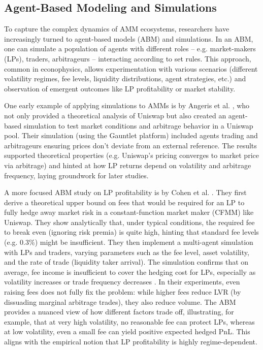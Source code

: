 \documentclass[11pt]{article}
\begin{document}
\subsection{Agent-Based Modeling and Simulations}
To capture the complex dynamics of AMM ecosystems, researchers have increasingly turned to agent-based models (ABM) and simulations. In an ABM, one can simulate a population of agents with different roles – e.g. market-makers (LPs), traders, arbitrageurs – interacting according to set rules. This approach, common in econophysics, allows experimentation with various scenarios (different volatility regimes, fee levels, liquidity distributions, agent strategies, etc.) and observation of emergent outcomes like LP profitability or market stability.

One early example of applying simulations to AMMs is by Angeris et al. \cite{angeris2020}, who not only provided a theoretical analysis of Uniswap but also created an agent-based simulation to test market conditions and arbitrage behavior in a Uniswap pool. Their simulation (using the Gauntlet platform) included agents trading and arbitrageurs ensuring prices don’t deviate from an external reference. The results supported theoretical properties (e.g. Uniswap’s pricing converges to market price via arbitrage) and hinted at how LP returns depend on volatility and arbitrage frequency, laying groundwork for later studies.

A more focused ABM study on LP profitability is by Cohen et al. \cite{cohen2023}. They first derive a theoretical upper bound on fees that would be required for an LP to fully hedge away market risk in a constant-function market maker (CFMM) like Uniswap. They show analytically that, under typical conditions, the required fee to break even (ignoring risk premia) is quite high, hinting that standard fee levels (e.g. 0.3\%) might be insufficient. They then implement a multi-agent simulation with LPs and traders, varying parameters such as the fee level, asset volatility, and the rate of trade (liquidity taker arrival). The simulation confirms that on average, fee income is insufficient to cover the hedging cost for LPs, especially as volatility increases or trade frequency decreases \cite{cohen2023}. In their experiments, even raising fees does not fully fix the problem: while higher fees reduce LVR (by dissuading marginal arbitrage trades), they also reduce volume. The ABM provides a nuanced view of how different factors trade off, illustrating, for example, that at very high volatility, no reasonable fee can protect LPs, whereas at low volatility, even a small fee can yield positive expected hedged PnL. This aligns with the empirical notion that LP profitability is highly regime-dependent.
\end{document}
